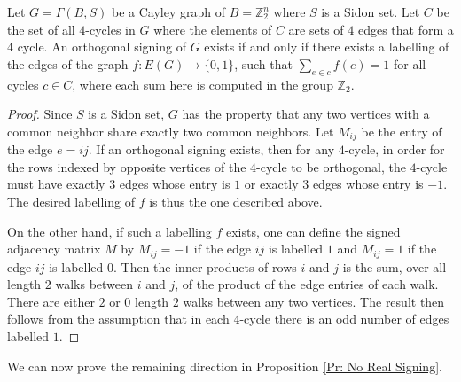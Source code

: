 \begin{lemma}
\label{Lm: cycles}
Let $G = \Gamma(B, S)$ be a Cayley graph of $B=\mathbb{Z}_{2}^{n}$ 
where $S$ is a Sidon set. Let $C$ be the set  of all $4$-cycles 
in $G$ where the elements of $C$ are sets of $4$ edges that form a $4$ cycle. 
An orthogonal signing of $G$ exists if and only if 
there exists a labelling of the edges of the graph 
$f: E(G) \xrightarrow{} \{0, 1\}$, 
such that $\sum_{e \in c} f(e) = 1$ for all cycles $c \in C$, where
each sum here is computed in the group $\mathbb{Z}_2$.
\end{lemma}
\begin{proof}
Since $S$ is a Sidon set, $G$ has the property that any two vertices 
with a common neighbor share exactly two common neighbors. 
Let $M_{ij}$ be the entry of the edge $e = ij$. 
If an orthogonal signing exists, then for any $4$-cycle, in order for 
the rows indexed by opposite vertices of the $4$-cycle to be orthogonal, 
the $4$-cycle must have exactly $3$ edges whose entry is $1$ or exactly 
$3$ edges whose entry is $-1$. The desired labelling of $f$ is thus the
one described above.

On the other hand, if such a labelling $f$ exists, one can define the signed 
adjacency matrix $M$ by $M_{ij} = -1$ if the edge $ij$ is labelled $1$ 
and $M_{ij} = 1$ if the edge $ij$ is labelled $0$. 
Then the inner products of rows $i$ and $j$ is the sum, over all 
length $2$ walks between $i$ and $j$, of the product of the edge 
entries of each walk. There are either $2$ or $0$ length 
$2$ walks between any two vertices. The result 
then follows from the assumption that in each $4$-cycle there is
an odd number of edges labelled $1$.
\end{proof}

We can now prove the remaining direction in Proposition \ref{Pr: No Real Signing}.

